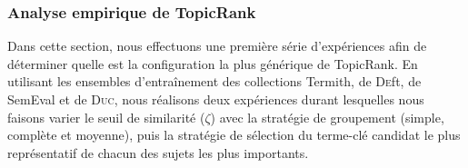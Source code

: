       \subsubsection{Analyse empirique de TopicRank}
      \label{subsubsec:main:domain_independent_keyphrase_extraction-unsupervised_automatic_keyphrase_extraction-evaluation-empirical_analysis_of_topicrank}
        Dans cette section, nous effectuons une première série d'expériences
        afin de déterminer quelle est la configuration la plus générique de
        TopicRank. En utilisant les ensembles d'entraînement des collections
        Termith, de \textsc{De}ft, de SemEval et de \textsc{Duc}, nous réalisons
        deux expériences durant lesquelles nous faisons varier le seuil de
        similarité ($\zeta$) avec la stratégie de groupement (simple, complète
        et moyenne), puis la stratégie de sélection du terme-clé candidat le
        plus représentatif de chacun des sujets les plus importants.
